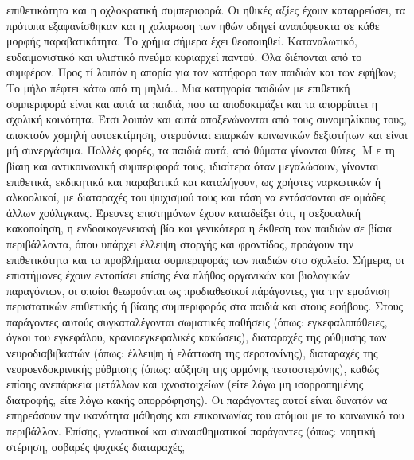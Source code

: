 \documentclass[12pt,a4paper]{book}
\begin{document}
επιθετικότητα και η οχλοκρατική συμπεριφορά. Οι ηθικές αξίες έχουν καταρρεύσει,
τα πρότυπα εξαφανίσθηκαν και η χαλαρωση των ηθών οδηγεί αναπόφευκτα σε κάθε
μορφής παραβατικότητα.
\newline\setlength{\parindent}{20pt}\indent Το χρήμα σήμερα έχει θεοποιηθεί.
Καταναλωτικό, ευδαιμονιστικό και υλιστικό πνεύμα κυριαρχεί παντού. Όλα
διέπονται από το συμφέρον. Προς τί λοιπόν η απορία για τον κατήφορο των παιδιών
και των εφήβων; Το μήλο πέφτει κάτω από τη μηλιά\ldots
\newline\setlength{\parindent}{20pt}\indent Μια κατηγορία παιδιών με επιθετική
συμπεριφορά είναι και αυτά τα παιδιά, που τα αποδοκιμάζει και τα απορρίπτει η
σχολική κοινότητα. Έτσι λοιπόν και αυτά αποξενώνονται από τους συνομηλίκους
τους, αποκτούν χσμηλή αυτοεκτίμηση, στερούνται επαρκών κοινωνικών δεξιοτήτων και
είναι μή συνεργάσιμα. Πολλές φορές, τα παιδιά αυτά, από θύματα γίνονται θύτες. Μ
ε τη βίαιη και αντικοινωνική συμπεριφορά τους, ιδιαίτερα όταν μεγαλώσουν,
γίνονται επιθετικά, εκδικητικά και παραβατικά και καταλήγουν, ως χρήστες
ναρκωτικών ή αλκοολικοί, με διαταραχές του ψυχισμού τους και τάση να
εντάσσονται σε ομάδες άλλων χούλιγκανς.
\newline\setlength{\parindent}{20pt}\indent Έρευνες επιστημόνων έχουν καταδείξει
ότι, η σεξουαλική κακοποίηση, η ενδοοικογενειακή βία και γενικότερα η έκθεση των
παιδιών σε βίαια περιβάλλοντα, όπου υπάρχει έλλειψη στοργής και φροντίδας,
προάγουν την επιθετικότητα και τα προβλήματα συμπεριφοράς των παιδιών στο
σχολείο.
\newline\setlength{\parindent}{20pt}\indent Σήμερα, οι επιστήμονες έχουν
εντοπίσει επίσης ένα πλήθος οργανικών και βιολογικών παραγόντων, οι οποίοι
θεωρούνται ως προδιαθεσικοί πάράγοντες, για την εμφάνιση περιστατικών επιθετικής
ή βίαιης συμπεριφοράς στα παιδιά και στους εφήβους. Στους παράγοντες αυτούς
συγκαταλέγονται σωματικές παθήσεις (όπως: εγκεφαλοπάθειες, όγκοι του εγκεφάλου,
κρανιοεγκεφαλικές κακώσεις), διαταραχές της ρύθμισης των νευροδιαβιβαστών
(όπως: έλλειψη ή ελάττωση της σεροτονίνης), διαταραχές της νευροενδοκρινικής
ρύθμισης (όπως: αύξηση της ορμόνης τεστοστερόνης), καθώς επίσης ανεπάρκεια
μετάλλων και ιχνοστοιχείων (είτε λόγω μη ισορροπημένης διατροφής, είτε λόγω
κακής απορρόφησης). Οι παράγοντες αυτοί είναι δυνατόν να επηρεάσουν την
ικανότητα μάθησης και επικοινωνίας του ατόμου με το κοινωνικό του περιβάλλον.
\newline\setlength{\parindent}{20pt}\indent Επίσης, γνωστικοί και
συναισθηματικοί παράγοντες (όπως: νοητική στέρηση, σοβαρές ψυχικές διαταραχές,
\end{document}
